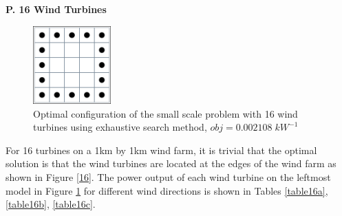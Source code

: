     \textbf{P. 16 Wind Turbines}
        \begin{figure}[H]
            \centering
            \includegraphics[width=3cm]{Figures/Chromosomes/16.png}
            \caption{Optimal configuration of the small scale problem with 16 wind turbines using exhaustive search method, $obj=0.002108\;kW^{-1}$}
            \label{small16}
        \end{figure}
        
        For 16 turbines on a 1km by 1km wind farm, it is trivial that the optimal solution is that the wind turbines are located at the edges of the wind farm as shown in Figure \ref{16}. The power output of each wind turbine on the leftmost model in Figure \ref{small16} for different wind directions is shown in Tables \ref{table16a}, \ref{table16b}, \ref{table16c}.
        
